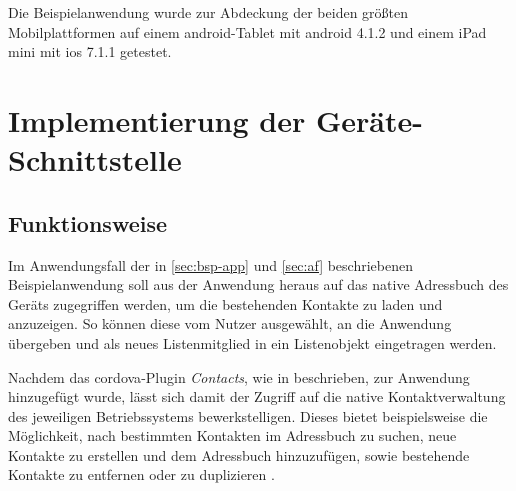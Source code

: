 
Die Beispielanwendung wurde zur Abdeckung der beiden größten Mobilplattformen auf einem \gls{android}-Tablet mit \gls{android} 4.1.2 und einem iPad mini mit \gls{ios} 7.1.1 getestet.

\chapter{Implementierung der Geräte-Schnittstelle}	\label{sec:impl} \label{sec:contacts} %
		

\section{Funktionsweise}

Im Anwendungsfall  der in \autoref{sec:bsp-app} und \autoref{sec:af} beschriebenen Beispielanwendung soll  aus der Anwendung heraus auf das native Adressbuch des Geräts zugegriffen werden, um die bestehenden Kontakte zu laden und anzuzeigen. So können diese vom Nutzer ausgewählt, an die Anwendung übergeben und als neues Listenmitglied in ein Listenobjekt eingetragen werden.

Nachdem das \gls{cordova}-Plugin \emph{Contacts}, wie in  beschrieben, zur Anwendung hinzugefügt wurde, lässt sich damit der Zugriff auf die native Kontaktverwaltung des jeweiligen Betriebssystems bewerkstelligen.
Dieses bietet beispielsweise die Möglichkeit, nach bestimmten Kontakten im Adressbuch zu suchen, neue Kontakte zu erstellen und dem Adressbuch hinzuzufügen, sowie bestehende Kontakte zu entfernen oder zu duplizieren \cite{Cordova_Plugin_Registry_Contacts}.

